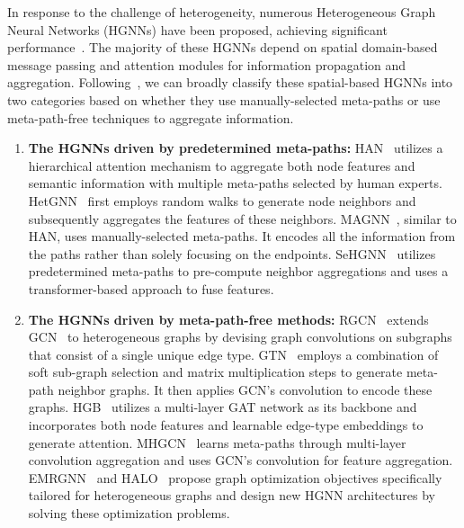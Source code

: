 \documentclass{article}
\begin{document}
In response to the challenge of heterogeneity, numerous Heterogeneous Graph Neural Networks (HGNNs) have been proposed, achieving significant performance~\cite{han,magnn,mhgcn,halo}.  The majority of these HGNNs depend on spatial domain-based message passing and attention modules for information propagation and aggregation.
Following~\cite{sehgnn}, we can broadly classify these spatial-based HGNNs into two categories based on whether they use manually-selected meta-paths or use meta-path-free techniques to aggregate information.







\begin{enumerate}
    \item[] \textbf{The HGNNs driven by predetermined meta-paths:} 
     HAN~\cite{han} utilizes a hierarchical attention mechanism to aggregate both node features and semantic information with multiple meta-paths selected by human experts. 
     HetGNN~\cite{hetgnn} first employs random walks to generate node neighbors and subsequently aggregates the features of these neighbors.
     MAGNN~\cite{magnn}, similar to HAN, uses manually-selected meta-paths. It encodes all the information from the paths rather than solely focusing on the endpoints.
     SeHGNN~\cite{sehgnn} utilizes predetermined meta-paths to pre-compute neighbor aggregations and uses a transformer-based approach to fuse features.
     


   
    \item[] \textbf{The HGNNs driven by meta-path-free methods:} 
    RGCN~\cite{rgcn} extends GCN~\cite{gcn} to heterogeneous graphs by devising graph convolutions on subgraphs that consist of a single unique edge type. 
    GTN~\cite{gtn} employs a combination of soft sub-graph selection and matrix multiplication steps to generate meta-path neighbor graphs. It then applies GCN's convolution to encode these graphs.
    HGB~\cite{hgb} utilizes a multi-layer GAT network as its backbone and incorporates both node features and learnable edge-type embeddings to generate attention. 
    MHGCN~\cite{mhgcn} learns meta-paths through multi-layer convolution aggregation and uses GCN's convolution for feature aggregation.
    EMRGNN~\cite{emrgnn} and HALO~\cite{halo} propose graph optimization objectives specifically tailored for heterogeneous graphs and design new HGNN architectures by solving these optimization problems.
\end{enumerate}
\end{document}
